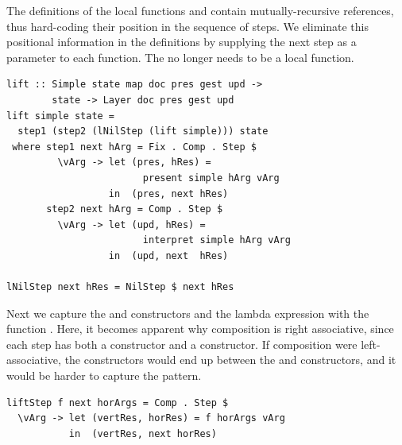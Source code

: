 \documentclass[preprint,natbib]{sigplanconf}
\begin{document}
The definitions of the local functions  and  contain mutually-recursive references, thus hard-coding their position in the sequence of steps. We eliminate this positional information in the definitions by supplying the next step as a parameter to each function. The  no longer needs to be a local function.

      
      
\begin{small} %
\begin{verbatim}
lift :: Simple state map doc pres gest upd -> 
        state -> Layer doc pres gest upd
lift simple state =  
  step1 (step2 (lNilStep (lift simple))) state
 where step1 next hArg = Fix . Comp . Step $
         \vArg -> let (pres, hRes) = 
                        present simple hArg vArg
                  in  (pres, next hRes)
       step2 next hArg = Comp . Step $
         \vArg -> let (upd, hRes) = 
                        interpret simple hArg vArg
                  in  (upd, next  hRes)

lNilStep next hRes = NilStep $ next hRes
\end{verbatim}%
\end{small}

Next we  capture the  and  constructors and the lambda expression with the function . Here, it becomes apparent why composition is right associative, since each step has both a constructor and a  constructor. If composition were left-associative, the  constructors would end up between the  and  constructors, and it would be harder to capture the pattern.

\begin{small} %
\begin{verbatim}
liftStep f next horArgs = Comp . Step $ 
  \vArg -> let (vertRes, horRes) = f horArgs vArg
           in  (vertRes, next horRes)
\end{verbatim}%
\end{small}
\end{document}
